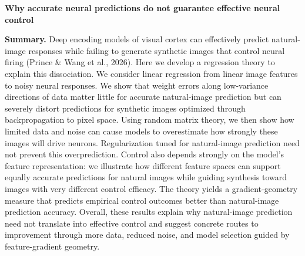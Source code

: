 \documentclass[12pt,a4paper]{article}
\begin{document}
{\large\bfseries Why accurate neural predictions do not guarantee effective neural control\par}

\textbf{Summary.}
Deep encoding models of visual cortex can effectively predict natural-image responses while failing to generate synthetic images that control neural firing (Prince \& Wang et al., 2026). Here we develop a regression theory to explain this dissociation. We consider linear regression from linear image features to noisy neural responses. We show that weight errors along low-variance directions of data matter little for accurate natural-image prediction but can severely distort predictions for synthetic images optimized through backpropagation to pixel space. Using random matrix theory, we then show how limited data and noise can cause models to overestimate how strongly these images will drive neurons. Regularization tuned for natural-image prediction need not prevent this overprediction. Control also depends strongly on the model's feature representation: we illustrate how different feature spaces can support equally accurate predictions for natural images while guiding synthesis toward images with very different control efficacy. The theory yields a gradient-geometry measure that predicts empirical control outcomes better than natural-image prediction accuracy. Overall, these results explain why natural-image prediction need not translate into effective control and suggest concrete routes to improvement through more data, reduced noise, and model selection guided by feature-gradient geometry.
\end{document}

